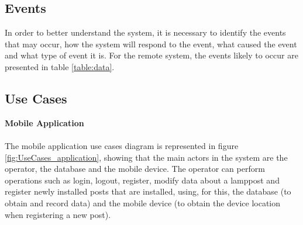 \subsection{Events}
In order to better understand the system, it is necessary to identify the events that may occur, how the system will respond to the event, what caused the event and what type of event it is. For the remote system, the events likely to occur are presented in table \ref{table:data}.

\begin{table}[ht]
	\centering
		
	\caption{Remote system events.}
	\label{table:data}
\end{table}


\subsection{Use Cases}
\textbf{Mobile Application}
\paragraph{}
The mobile application use cases diagram is represented in figure \ref{fig:UseCases_application}, showing that the main actors in the system are the operator, the database and the mobile device. The operator can perform operations such as login, logout, register, modify data about a lamppost and register newly installed posts that are installed, using, for this, the database (to obtain and record data) and the mobile device (to obtain the device location when registering a new post).

